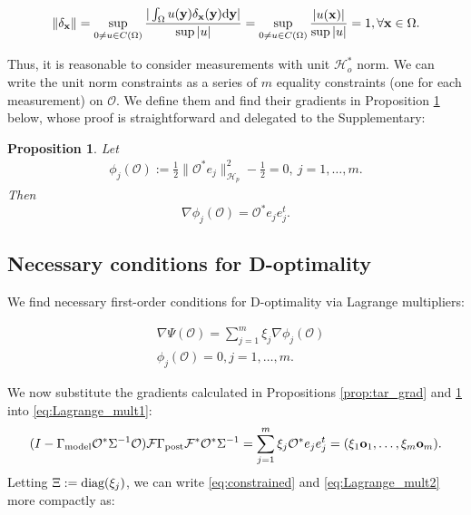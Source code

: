 \documentclass[ba]{imsart}
\newcommand{\der}{\text{\textup{d}}}
\newcommand{\diag}{\textup{diag}}
\providecommand{\x}{}
\renewcommand{\x}{\mathbf{x}}
\newcommand{\y}{\mathbf{y}}
\newcommand{\hilp}{\mathcal{H}_p}
\newcommand{\hilo}{\mathcal{H}_o}
\newcommand{\obs}{\mathcal{O}}
\newcommand{\fwd}{\mathcal{F}}
\newcommand{\tar}{\Psi}
\newcommand{\meas}{\mathbf{o}}
\theoremstyle{plain}
\newtheorem{proposition}[theorem]{Proposition}
\theoremstyle{definition}
\theoremstyle{remark}
\begin{document}
\begin{equation}
  \| \delta_{\x} \| = \sup_{0 \neq u \in C(\Omega)}
  \frac{
    |\int_{\Omega}u(\y) \delta_{\x}(\y) \der \y|
  }{
    \sup|u|
  } = \sup_{0 \neq u \in C(\Omega)} \frac{|u(\x)|}{\sup|u|} = 1,
  \forall \x \in \Omega.
\end{equation}

Thus, it is reasonable to consider measurements with unit $\hilo^*$
norm. We can write the unit norm constraints as a series of $m$
equality constraints (one for each measurement) on $\obs$. We define
them and find their gradients in Proposition
\ref{prop:constraints_grad} below, whose proof is straightforward and
delegated to the Supplementary:

\begin{proposition}\label{prop:constraints_grad}
  Let
  \begin{align*}
    \phi_j(\obs) :=\frac12 \| \obs^* e_j\|_{\hilp}^2 - \frac12 = 0,\ j=1,\dots,m.
  \end{align*}
  Then
  \begin{equation*}
\nabla \phi_j(\obs) = \obs^* e_je_j^t.
  \end{equation*}
\end{proposition}







\subsection{Necessary conditions for D-optimality}
We find necessary first-order conditions for D-optimality via Lagrange
multipliers:

\begin{align}
  &\nabla \tar(\obs) = \sum_{j=1}^m \xi_j \nabla \phi_j (\obs)
  \label{eq:Lagrange_mult1} \\
    &\phi_j(\obs) = 0, j = 1,\dots,m. \label{eq:Lagrange_mult2}
\end{align}

We now substitute the gradients calculated in Propositions
\ref{prop:tar_grad} and \ref{prop:constraints_grad} into
\eqref{eq:Lagrange_mult1}:
\begin{equation}\label{eq:constrained}
  (I - \modcov \obs^* \Sigma^{-1} \obs) \fwd \postcov \fwd^* \obs^*\Sigma^{-1}
  = \sum_{j=1}^m \xi_j \obs^* e_je_j^t = (\xi_1 \meas_1,\dots,\xi_m \meas_m).
\end{equation} 
Letting $\Xi := \diag(\xi_j)$, we can write \eqref{eq:constrained} and
\eqref{eq:Lagrange_mult2} more compactly as:
\end{document}
